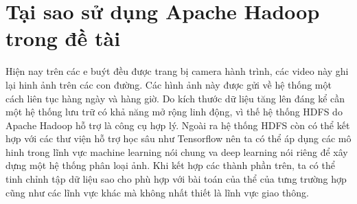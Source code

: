 \section{ Tại sao sử dụng Apache Hadoop trong đề tài}
Hiện nay trên các e buýt đều được trang bị camera hành trình, các video này ghi lại hinh ảnh trên các con đường. Các hình ảnh này được gửi về hệ thống một cách liên tục hàng ngày và hàng giờ. Do kích thước dữ liệu tăng lên đáng kể cần một hệ thống lưu trữ có khả năng mở rộng linh động, vì thế hệ thống HDFS do Apache Hadoop hỗ trợ là công cụ hợp lý. Ngoài ra hệ thống HDFS còn có thể kết hợp với các thư viện hỗ trợ học sâu như Tensorflow nên ta có thể áp dụng các mô hinh trong lĩnh vực machine learning nói chung va deep learning nói riêng để xây dựng một hệ thống phân loại ảnh. Khi kết hợp các thành phần trên, ta có thể tinh chỉnh tập dữ liệu sao cho phù hợp với bài toán của thể của tưng trường hợp cũng như các lĩnh vực khác mà không nhất thiết là lĩnh vực giao thông.
